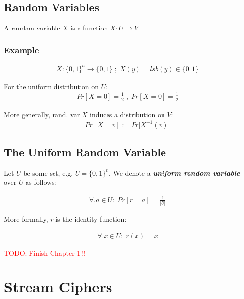 \documentclass[11pt,a4paper]{report}
\newcommand\todo[1]{\noindent\textcolor{red}{TODO: #1}}
\begin{document}
\section{Random Variables}
A random variable $X$ is a function $X : U \rightarrow V$

\subsection{Example}
\begin{gather*}
X : \{ 0,1 \}^n \rightarrow \{ 0,1 \} \; ; \; X(y) = lsb(y) \in \{0,1\}
\end{gather*}

\noindent
For the uniform distribution on $U$:
\begin{gather*}
	Pr [X=0] = \frac{1}{2} \; , \; Pr [X=0] = \frac{1}{2}
\end{gather*}

\noindent
More generally, rand. var $X$ induces a distribution on $V$: 
\begin{gather*}
	Pr [X=v] := Pr \big[ X^{-1}(v) \big]
\end{gather*}

\section{The Uniform Random Variable}
Let $U$ be some set, e.g. $U = \{0,1\}^n$. We denote a \emph{\textbf{uniform random variable}} over $U$ as follows: 

\begin{gather*}
	\forall.a \in U : \; Pr [r = a] = \frac{1}{|U|}
\end{gather*}

\noindent
More formally, $r$ is the identity function: 

\begin{gather*}
	\forall.x \in U : \; r(x) = x
\end{gather*}

\todo{Finish Chapter 1!!!}

\chapter{Stream Ciphers}
\end{document}
